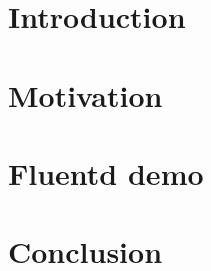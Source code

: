 \section{Introduction} \label{sec: intro}
\quad \quad 
\section{Motivation} \label{sec:motiv}
\quad \quad 
\section{Fluentd demo}
\quad \quad 
\section{Conclusion} \label{sec:conclude}
\quad \quad 